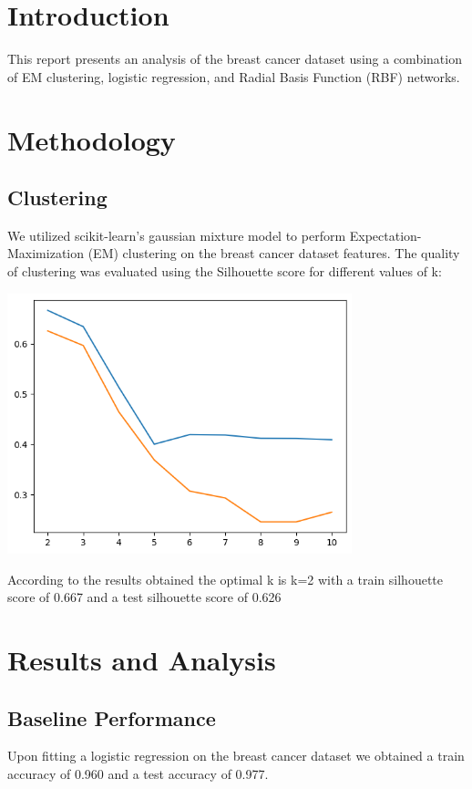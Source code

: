 \documentclass{article}
\begin{document}
\maketitle

\section{Introduction}
This report presents an analysis of the breast cancer dataset using a combination of EM clustering, logistic regression, and Radial Basis Function (RBF) networks. 

\section{Methodology}
\subsection{Clustering}
We utilized scikit-learn's gaussian mixture model to perform Expectation-Maximization (EM) clustering on the breast cancer dataset features. 
The quality of clustering was evaluated using the Silhouette score for different values of k: 

\includegraphics[width=10cm]{img/silhouttes.png}

According to the results obtained the optimal k is k=2 with a train silhouette score of 0.667 and a test silhouette score of 0.626

\section{Results and Analysis}
\subsection{Baseline Performance}
Upon fitting a logistic regression on the breast cancer dataset we obtained a train accuracy of 0.960 and a test accuracy of 0.977. 
\end{document}
